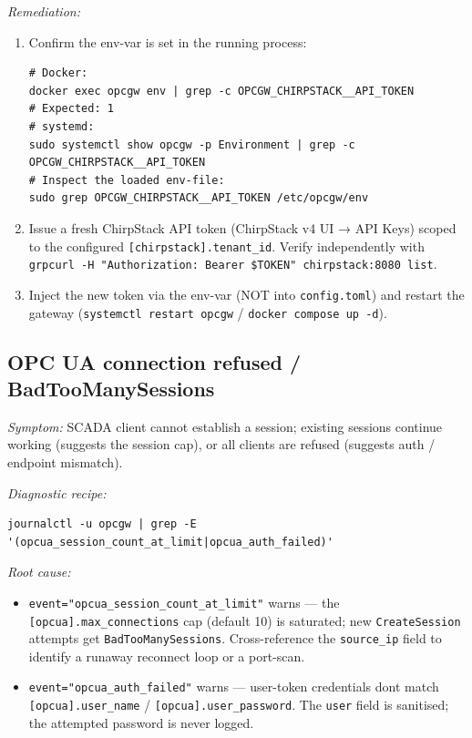 \emph{Remediation:}

\begin{enumerate}
\def\labelenumi{\arabic{enumi}.}
\item
  Confirm the env-var is set in the running process:

\begin{lstlisting}
# Docker:
docker exec opcgw env | grep -c OPCGW_CHIRPSTACK__API_TOKEN
# Expected: 1
# systemd:
sudo systemctl show opcgw -p Environment | grep -c OPCGW_CHIRPSTACK__API_TOKEN
# Inspect the loaded env-file:
sudo grep OPCGW_CHIRPSTACK__API_TOKEN /etc/opcgw/env
\end{lstlisting}
\item
  Issue a fresh ChirpStack API token (ChirpStack v4 UI → API Keys) scoped to the configured \texttt{{[}chirpstack{]}.tenant\_id}. Verify independently with \texttt{grpcurl\ -H\ "Authorization:\ Bearer\ \$TOKEN"\ chirpstack:8080\ list}.
\item
  Inject the new token via the env-var (NOT into \texttt{config.toml}) and restart the gateway (\texttt{systemctl\ restart\ opcgw} / \texttt{docker\ compose\ up\ -d}).
\end{enumerate}

\subsection{OPC UA connection refused / BadTooManySessions}\label{sec-issue-opcua-connection-refused}

\emph{Symptom:} SCADA client cannot establish a session; existing sessions continue working (suggests the session cap), or all clients are refused (suggests auth / endpoint mismatch).

\emph{Diagnostic recipe:}

\begin{lstlisting}
journalctl -u opcgw | grep -E '(opcua_session_count_at_limit|opcua_auth_failed)'
\end{lstlisting}

\emph{Root cause:}

\begin{itemize}
\item
  \texttt{event="opcua\_session\_count\_at\_limit"} warns --- the \texttt{{[}opcua{]}.max\_connections} cap (default 10) is saturated; new \texttt{CreateSession} attempts get \texttt{BadTooManySessions}. Cross-reference the \texttt{source\_ip} field to identify a runaway reconnect loop or a port-scan.
\item
  \texttt{event="opcua\_auth\_failed"} warns --- user-token credentials don\textquotesingle t match \texttt{{[}opcua{]}.user\_name} / \texttt{{[}opcua{]}.user\_password}. The \texttt{user} field is sanitised; the attempted password is never logged.
\end{itemize}

